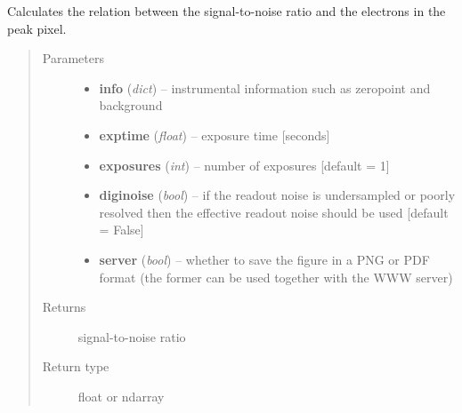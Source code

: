 \documentclass[a4paper,11pt,english]{sphinxmanual}
\begin{document}

\begin{fulllineitems}
\label{ETC:ETC.ETC.SNRproptoPeak}
Calculates the relation between the signal-to-noise ratio and the electrons in the peak pixel.
\begin{quote}\begin{description}
\item[{Parameters}] \leavevmode\begin{itemize}
\item {} 
\textbf{info} (\emph{dict}) -- instrumental information such as zeropoint and background

\item {} 
\textbf{exptime} (\emph{float}) -- exposure time {[}seconds{]}

\item {} 
\textbf{exposures} (\emph{int}) -- number of exposures {[}default = 1{]}

\item {} 
\textbf{diginoise} (\emph{bool}) -- if the readout noise is undersampled or poorly resolved then the effective readout noise
should be used {[}default = False{]}

\item {} 
\textbf{server} (\emph{bool}) -- whether to save the figure in a PNG or PDF format (the former can be used together with the WWW server)

\end{itemize}

\item[{Returns}] \leavevmode
signal-to-noise ratio

\item[{Return type}] \leavevmode
float or ndarray

\end{description}\end{quote}

\end{fulllineitems}

\end{document}
